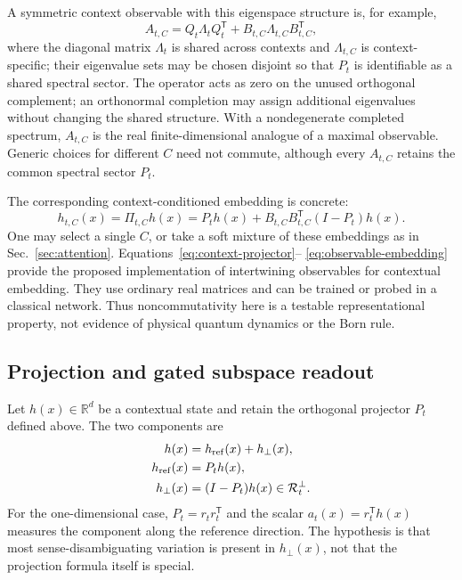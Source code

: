 \documentclass[
  aps,
  reprint,
  superscriptaddress,
  floatfix,
  nofootinbib,
  longbibliography
]{revtex4-2}
\newcommand{\R}{\mathbb{R}}
\newcommand{\T}{^{\mathsf{T}}}
\begin{document}
A symmetric context observable with this eigenspace structure is, for
example,
%
\begin{equation}
\label{eq:context-observable}
A_{t,C}
=Q_t\Lambda_tQ_t\T
 +B_{t,C}\Lambda_{t,C}B_{t,C}\T,
\end{equation}
%
where the diagonal matrix $\Lambda_t$ is shared across contexts and
$\Lambda_{t,C}$ is context-specific; their eigenvalue sets may be chosen
disjoint so that $P_t$ is identifiable as a shared spectral sector.  The operator acts as zero on the
unused orthogonal complement; an orthonormal completion may assign additional
eigenvalues without changing the shared structure.  With a nondegenerate
completed spectrum, $A_{t,C}$ is the real finite-dimensional analogue of a
maximal observable.  Generic choices for different $C$ need not commute,
although every $A_{t,C}$ retains the common spectral sector $P_t$.

The corresponding context-conditioned embedding is concrete:
%
\begin{equation}
\label{eq:observable-embedding}
h_{t,C}(x)
=\Pi_{t,C}h(x)
=P_t h(x)+B_{t,C}B_{t,C}\T(I-P_t)h(x).
\end{equation}
%
One may select a single $C$, or take a soft mixture of these embeddings as in
Sec.~\ref{sec:attention}.  Equations~\eqref{eq:context-projector}--
\eqref{eq:observable-embedding} provide the proposed implementation of
intertwining observables for contextual embedding.  They use ordinary real
matrices and can be trained or probed in a classical network.  Thus
noncommutativity here is a testable representational property, not evidence of
physical quantum dynamics or the Born rule.

\subsection{Projection and gated subspace readout}
\label{sec:gated}

Let $h(x)\in\R^d$ be a contextual state and retain the orthogonal projector
$P_t$ defined above. The two components are
%
\begin{align}
\label{eq:reference-decomp}
h(x)&=h_{\rm ref}(x)+h_\perp(x),\\
h_{\rm ref}(x)&=P_t h(x),\nonumber\\
h_\perp(x)&=(I-P_t)h(x)\in\mathcal R_t^\perp.\nonumber
\end{align}
%
For the one-dimensional case, $P_t=r_t r_t\T$ and the scalar
$a_t(x)=r_t\T h(x)$ measures the component along the reference direction.
The hypothesis is that most sense-disambiguating variation is present in
$h_\perp(x)$, not that the projection formula itself is special.
\end{document}
